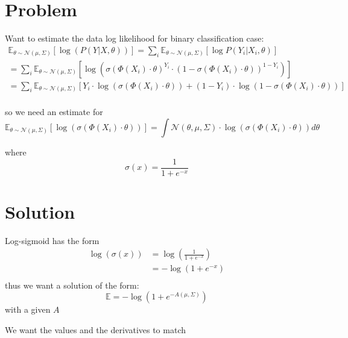 \documentclass[a4paper]{scrartcl}
\begin{document}
\section{Problem}
    Want to estimate the data log likelihood for binary classification case:
    \begin{align}
        \mathbb{E}_{\theta \sim \mathcal{N}(\mu, \Sigma)}[\log(P(Y \vert X, \theta))]
        = \sum_i \mathbb{E}_{\theta \sim \mathcal{N}(\mu, \Sigma)}[\log P(Y_i \vert X_i , \theta)] \\
        = \sum_i \mathbb{E}_{\theta \sim \mathcal{N}(\mu, \Sigma)}[\log(\sigma(\Phi(X_i)\cdot\theta)^{Y_i} \cdot (1-\sigma(\Phi(X_i)\cdot\theta))^{1- Y_i})] \\
        = \sum_i \mathbb{E}_{\theta \sim \mathcal{N}(\mu, \Sigma)}[Y_i \cdot \log (\sigma(\Phi(X_i)\cdot\theta)) + (1- Y_i) \cdot \log(1-\sigma(\Phi(X_i)\cdot\theta))] \\
    \end{align}
    
    so we need an estimate for
    \begin{equation}
        \mathbb{E}_{\theta \sim \mathcal{N}(\mu, \Sigma)}[\log (\sigma(\Phi(X_i)\cdot\theta))]
        =\int \mathcal{N}(\theta, \mu, \Sigma) \cdot \log (\sigma(\Phi(X_i)\cdot\theta)) d\theta
    \end{equation}

    where 
    \begin{equation}
        \sigma(x) = \frac{1}{1+e^{-x}}
    \end{equation}

\section{Solution}
    Log-sigmoid has the form
    \begin{align}
        \log(\sigma(x)) 
        &= \log(\frac{1}{1+e^{-x}})\\
        &= -\log(1+e^{-x})\\
    \end{align}
    thus we want a solution of the form:
    \begin{equation}
        \mathbb{E} = -\log(1 + e^{-A(\mu, \Sigma)})
    \end{equation}
    with a given $A$


    We want the values and the derivatives to match
\end{document}
